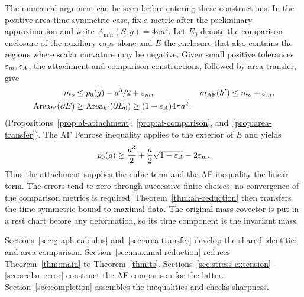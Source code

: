 The numerical argument can be seen before entering these constructions.
In the positive-area time-symmetric case, fix a metric after the
preliminary approximation and write
$A_{\min}(S;g)=4\pi a^2$. Let $E_0$ denote the comparison enclosure of
the auxiliary caps alone and $E$ the enclosure that also contains the
regions where scalar curvature may be negative. Given small positive
tolerances $\varepsilon_m,\varepsilon_A$, the attachment and comparison constructions,
followed by area transfer, give
\[
 \begin{aligned}
 m_o&\le p_0(g)-a^3/2+\varepsilon_m,
 &m_{\mathrm{AF}}(h')&\le m_o+\varepsilon_m,\\
 \operatorname{Area}_{h'}(\partial E)&\ge\operatorname{Area}_{h'}(\partial E_0)
                    \ge(1-\varepsilon_A)4\pi a^2.
 \end{aligned}
\]
(Propositions~\ref{prop:af-attachment}, \ref{prop:af-comparison},
and~\ref{prop:area-transfer}).
The AF Penrose inequality applies to the exterior of $E$ and yields
\[
 p_0(g)\ge \frac{a^3}{2}
       +\frac a2\sqrt{1-\varepsilon_A}-2\varepsilon_m.
\]
Thus the attachment supplies the cubic term and the AF inequality the
linear term. The errors tend to zero through successive finite choices;
no convergence of the comparison metrics is required.
Theorem~\ref{thm:ah-reduction} then transfers the time-symmetric bound
to maximal data. The original mass covector is put in a rest chart
before any deformation, so its time component is the invariant mass.

Sections~\ref{sec:graph-calculus} and~\ref{sec:area-transfer} develop
the shared identities and area comparison. Section~\ref{sec:maximal-reduction}
reduces Theorem~\ref{thm:main} to Theorem~\ref{thm:ts}.
Sections~\ref{sec:stress-extension}--\ref{sec:scalar-error} construct
the AF comparison for the latter. Section~\ref{sec:completion}
assembles the inequalities and checks sharpness.
